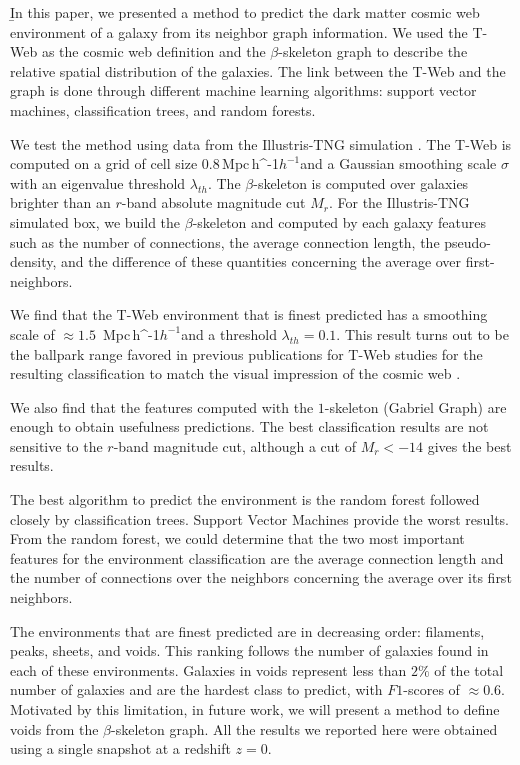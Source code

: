 \documentclass[usenatbib]{mnras}
\newcommand{\Mpch}{\,{\rm Mpc}\,\ifmmode h^{-1}\else $h^{-1}$\fi}
\begin{document}
{\b
In this paper, we presented a method to predict the dark matter cosmic web environment of a galaxy from its neighbor graph information.
We used the T-Web as the cosmic web definition \citep{Forero-Romero2009} and the $\beta$-skeleton graph \citep{Fang2019} 
to describe the relative spatial distribution of the galaxies. 
The link between the T-Web and the graph is done through different
machine learning algorithms: support vector machines, classification trees, and random forests.

We test the method using data from the Illustris-TNG simulation \cite{Nelson2015}. The T-Web is computed on a grid of cell size $0.8$\Mpch and a Gaussian smoothing scale $\sigma$ with an eigenvalue threshold $\lambda_{th}$. The $\beta$-skeleton is computed over galaxies brighter than an $r$-band absolute magnitude cut $M_{r}$.
For the Illustris-TNG simulated box, we build the $\beta$-skeleton and computed by each galaxy features such as the number of connections, the average connection length, the pseudo-density, and the difference of these quantities concerning the average over first-neighbors.

We find that the T-Web environment that is finest predicted has a smoothing scale of $\approx1.5$ \Mpch and a threshold $\lambda_{th}=0.1$. 
This result turns out to be the ballpark range favored in previous publications for T-Web studies for the resulting classification to match the visual impression of the cosmic web \citep{Forero-Romero2009}.

We also find that the features computed with the $1$-skeleton 
(Gabriel Graph) are enough to obtain usefulness predictions. 
The best classification results are not sensitive to the $r$-band
magnitude cut, although a cut of $M_r<-14$ gives the best results.

The best algorithm to predict the environment is the random forest followed closely by classification trees. Support Vector Machines provide the worst results. From the random forest, we could determine that the two most important features for the environment classification are the average connection length and the number of connections over the neighbors concerning the average over its first neighbors.

The environments that are finest predicted are in decreasing order: 
filaments, peaks, sheets, and voids. This ranking follows the number of galaxies found in each of these environments. Galaxies in voids represent less than $2\%$ of the total number of galaxies and are the hardest class to predict, with $F1$-scores of $\approx0.6$. Motivated by this limitation, in future work, we will present a method to define voids from the $\beta$-skeleton graph. All the results we reported here were obtained using a single snapshot at a redshift $z=0$. 

}
\end{document}

